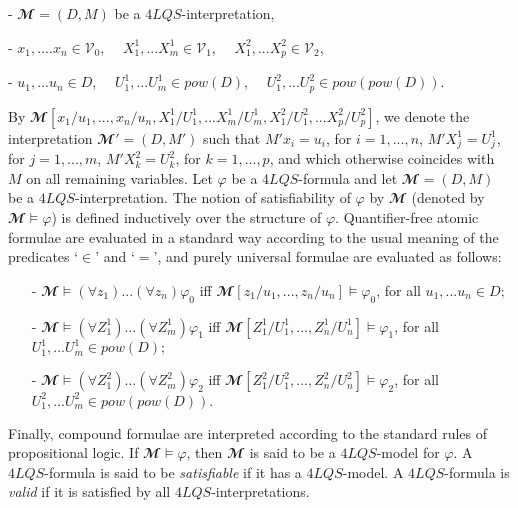 \documentclass[a4paper]{llncs}
\newcommand{\pow}{\textit{pow}}
\begin{document}
\smallskip
{- $\mathbfcal{M}=(D,M)$ be a $4LQS$-interpretation,}

{- $x_1,....x_n \in \mathcal{V}_0$,~~ $X^1 _1, ... X^1 _m \in \mathcal{V}_1$,~~ $X^2 _1, ... X^2 _p \in \mathcal{V}_2$,}

{- $u_1, ... u_n \in D$,~~ $U^1 _1, ... U^1 _m \in \pow(D)$,~~ $U^2 _1, ... U^2 _p \in \pow(\pow(D))$.}

\smallskip
\noindent
By  $\mathbfcal{M}  [ x_1 / u _1, ..., x_n  / u_n, X^1 _1 / U^1 _1, ... X^1_m / U^1_m, X^2_1 / U^2_1, ... X^2_p / U^2_p  ] $, we denote the interpretation $\mathbfcal{M}'=(D,M')$ such that $M'x_i =u_i$, for $i=1,...,n$, $M'X^1_j = U^1 _j$, for $j=1,...,m$, $M'X^2_k = U^2_k$, for $k=1,...,p$, and which otherwise coincides with $M$ on all remaining variables. Let $\varphi$ be a $4LQS$-formula and let $\mathbfcal{M} =(D,M)$ be a $4LQS$-interpretation. The notion of satisfiability of $\varphi$ by $\mathbfcal{M} $ (denoted by  $ \mathbfcal{M} \models \varphi$) is defined inductively over the structure of $\varphi$. Quantifier-free atomic formulae are evaluated in a standard way according to the usual meaning of the predicates `$\in$'
and `$=$', and purely universal formulae are evaluated as follows:
\begin{itemize}
\item[-]{ $\mathbfcal{M}  \models (\forall z_1) ... (\forall z_n) \varphi _0$ iff $\mathbfcal{M}   [ z_1 / u _1,...,z_n  / u_n] \models \varphi_0$, for all $u_1, ... u_n \in D ; $  }
\item[-]{ $\mathbfcal{M}  \models (\forall Z^1_1) ... (\forall Z^1_m) \varphi _1$ iff $\mathbfcal{M}   [ Z^1_1 / U^1 _1,...,Z^1_n  / U^1_n] \models \varphi_1$, for all $U^1_1, ... U^1_m \in \pow(D) ; $  }
\item[-]{ $\mathbfcal{M}  \models (\forall Z^2_1) ... (\forall Z^2_m) \varphi _2$ iff $\mathbfcal{M}   [ Z^2_1 / U^2 _1,...,Z^2_n  / U^2_n] \models \varphi_2$, for all $U^2_1, ... U^2_m \in \pow(\pow(D)).$  }
\end{itemize}
Finally, compound formulae are interpreted according to the standard rules of propositional logic. If $\mathbfcal{M} \models \varphi$, then $\mathbfcal{M} $ is said to be a $4LQS$-model for $\varphi$. A $4LQS$-formula is said to be \emph{satisfiable} if it has a $4LQS$-model. A $4LQS$-formula is \emph{valid} if it is satisfied by all $4LQS$-interpretations.
\end{document}
